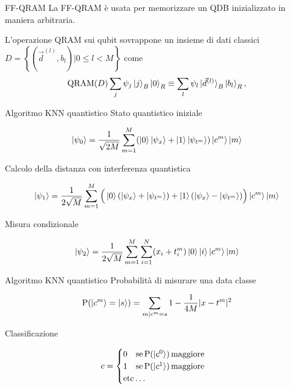 \documentclass{beamer}
\begin{document}
    \begin{frame}{FF-QRAM}
        La FF-QRAM è usata per memorizzare un QDB inizializzato in maniera arbitraria. 

        L'operazione QRAM sui qubit sovrappone un insieme di dati classici 
        $D = \left\{ \left( \vec{d}^{(l)}, b_l \right) | 0 \leq l < M \right\}$ come
        \begin{equation*} \label{eq:qram}
            \text{QRAM}(D) \sum_j \psi_j \ket{j}_B \ket{0}_R \equiv 
            \sum_l \psi_l \ket{\vec{d}^{(l)}}_B \ket{b_l}_R,
        \end{equation*}
    \end{frame}

    \begin{frame}{Algoritmo KNN quantistico}
        Stato quantistico iniziale

		\begin{equation*}
			\ket{\psi_0} = \frac{1}{\sqrt{2M}} \sum_{m=1}^M 
			(\ket{0}\ket{\psi_x}+\ket{1}\ket{\psi_{t^m}})\ket{c^m}\ket{m}
		\end{equation*}

		Calcolo della distanza con interferenza quantistica

		\begin{equation*}
			\ket{\psi_1} = \frac{1}{2\sqrt{M}}\sum_{m=1}^M 
			\Big( \ket{0}(\ket{\psi_x}+\ket{\psi_{t^m}}) + \ket{1}(\ket{\psi_x}-\ket{\psi_{t^m}}) \Big) \ket{c^m}\ket{m}
		\end{equation*}
	
		Misura condizionale

		\begin{equation*}
			\ket{\psi_2} = \frac{1}{2\sqrt{M}} \sum_{m=1}^M \sum_{i=1}^N
			(x_i+t_i^m)\ket{0}\ket{i}\ket{c^m}\ket{m}
		\end{equation*}
    \end{frame}

    \begin{frame}{Algoritmo KNN quantistico}
        Probabilità di misurare una data classe

		\begin{equation*}
			\text{P}(\ket{c^m} = \ket{s}) = \sum_{m|c^m=s} 
			1 - \frac{1}{4M} |x-t^m|^2
		\end{equation*}

		Classificazione

		\begin{equation*}
			c = \begin{cases}
			0 \quad \text{se}\, \text{P}(\ket{c^0})\, \text{maggiore} \\
			1 \quad \text{se}\, \text{P}(\ket{c^1})\, \text{maggiore} \\
			\text{etc}\ldots
		\end{cases}
		\end{equation*}
    \end{frame}
\end{document}
